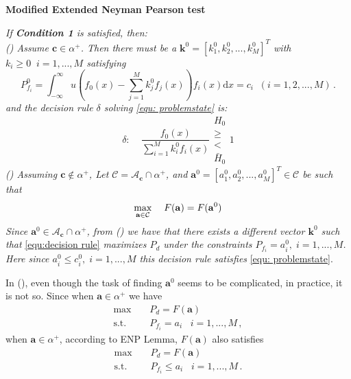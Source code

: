 \documentclass[12pt,journal,a4paper,twoside,onecolumn,draft]{IEEEtran}
\newcommand{\rmnum}[1]{\romannumeral #1}
\begin{document}
\begin{spacing}{2.5}
\noindent \textbf{Modified Extended Neyman Pearson test}

\noindent \textit{
If \textnormal{\textbf{Condition 1}} is satisfied, then:
\\\textnormal{(\rmnum{1})} Assume $\mathbf{c} \in \alpha^+$. Then there must be a $\mathbf{k}^0 = [k_1^0, k_2^0, ..., k_M^0]^T$ with $k_i \geq 0\;\;i=1, ..., M$ satisfying
}
\begin{equation}
\label{equ:Pf}
  P_{f_i}^0 = \int_{-\infty}^{\infty} u(f_0(x) - \sum_{j=1}^{M}k_j^0f_j(x))f_i(x)\mathrm{d}x = c_i \;\; (i= 1, 2, ..., M)\,.
\end{equation}
\textit{
and the decision rule $\delta $ solving  \eqref{equ: problemstate} is:
}
\begin{equation}
\label{equ:decision rule}
\delta:\;\;\;\;\frac{f_0(x)}{\sum_{i=1}^{M}k_i^0f_i(x)} \substack{H_0 \\ \geq \\ < \\ \bar{H}_0} 1
\end{equation}
\textit{
\noindent \textnormal{(\rmnum{2})} Assuming $\mathbf{c} \notin \alpha^+$, Let $\mathcal{C} = \mathcal{A}_{\mathbf{c}} \cap \alpha^+$, and $\mathbf{a}^0 = [a_1^0, a_2^0, ..., a_M^0]^T \in \mathcal{C}$ be such that
}
\begin{equation}
\label{equ: F0}
\max_{\mathbf{a} \in \mathcal{C}}\;\;\;\;F(\mathbf{a}) = F(\mathbf{a}^0)\\
\end{equation}
\textit{
Since $\mathbf{a}^0 \in \mathcal{A}_{\mathbf{c}} \cap \alpha^+$, from \textnormal{(\rmnum{1})} we have that there exists a different vector $\mathbf{k}^0$ such that}  \eqref{equ:decision rule} \textit{ maximizes $P_d$ under the constraints $P_{f_i} = a_i^0, \;i=1, ..., M$. Here since $a_i^0 \leq c_i^0, \;i=1, ..., M$ this decision rule  satisfies} \eqref{equ: problemstate}.

In  (\rmnum{2}), even though the task of finding $\mathbf{a}^0$ seems to be complicated, in practice, it is not so. Since when $\mathbf{a} \in \alpha^+$ we have 
\begin{equation}
  \begin{split}
    \max\;\;\;\;&P_d = F(\mathbf{a})\\
    \text{s.t.}\;\;\;\;&P_{f_i} = a_i\;\;\;i=1, ..., M\,,
  \end{split}
\end{equation}
when $\mathbf{a} \in \alpha^+$, according to ENP Lemma, $F(\mathbf{a})$ also satisfies
\begin{equation}
  \begin{split}
  \label{equ: F}
        \max\;\;\;\;&P_d = F(\mathbf{a})\\
    \text{s.t.}\;\;\;\;&P_{f_i} \leq a_i\;\;\;i=1, ..., M\,.
  \end{split}
\end{equation}


\end{spacing}
\end{document}
